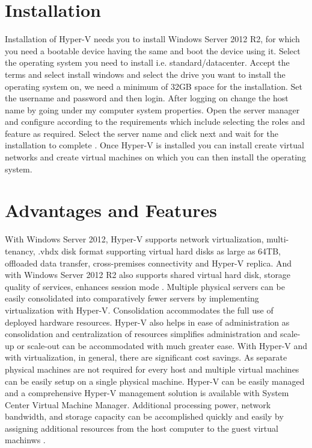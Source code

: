 \documentclass[9pt,twocolumn,twoside]{../../styles/osajnl}
\begin{document}
\section{Installation}

Installation of Hyper-V needs you to install Windows Server 2012 R2,
for which you need a bootable device having the same and boot the
device using it. Select the operating system you need to install
i.e. standard/datacenter.  Accept the terms and select install windows
and select the drive you want to install the operating system on, we
need a minimum of 32GB space for the installation. Set the username
and password and then login. After logging on change the host name by
going under my computer system properties. Open the server manager and
configure according to the requirements which include selecting the
roles and feature as required. Select the server name and click next
and wait for the installation to complete
\cite{www-hyperv-paper2}. Once Hyper-V is installed you can install
create virtual networks and create virtual machines on which you can
then install the operating system.

\section{Advantages and Features}

With Windows Server 2012, Hyper-V supports network virtualization,
multi-tenancy, .vhdx disk format supporting virtual hard disks as
large as 64TB, offloaded data transfer, cross-premises connectivity
and Hyper-V replica. And with Windows Server 2012 R2 also supports
shared virtual hard disk, storage quality of services, enhances
session mode \cite{www-hyperv-wikipedia}. Multiple physical servers
can be easily consolidated into comparatively fewer servers by
implementing virtualization with Hyper-V. Consolidation accommodates
the full use of deployed hardware resources. Hyper-V also helps in
ease of administration as consolidation and centralization of
resources simplifies administration and scale-up or scale-out can be
accommodated with much greater ease. With Hyper-V and with
virtualization, in general, there are significant cost savings. As
separate physical machines are not required for every host and
multiple virtual machines can be easily setup on a single physical
machine. Hyper-V can be easily managed and a comprehensive Hyper-V
management solution is available with System Center Virtual Machine
Manager.  Additional processing power, network bandwidth, and storage
capacity can be accomplished quickly and easily by assigning
additional resources from the host computer to the guest virtual
machinws \cite{www-hyperv-advantages}.
\end{document}
